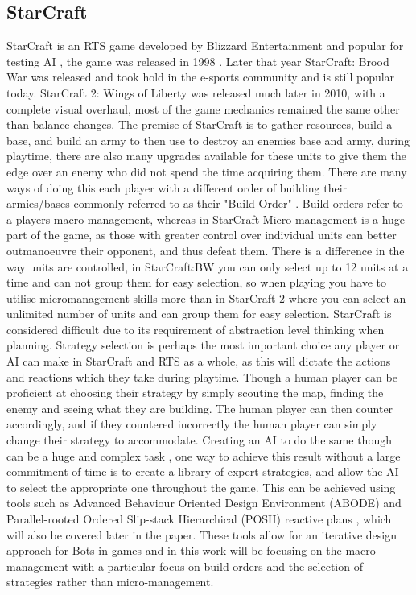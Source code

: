 \documentclass[journal]{IEEEtran}
\begin{document}
	\subsection{StarCraft}
	StarCraft is an RTS game developed by Blizzard Entertainment \cite{Blizzard} and popular for testing AI \cite{Current}, the game was released in 1998 \cite{Release}. Later that year StarCraft: Brood War was released and took hold in the e-sports community and is still popular today. StarCraft 2: Wings of Liberty was released much later in 2010, with a complete visual overhaul, most of the game mechanics remained the same other than balance changes. The premise of StarCraft is to gather resources, build a base, and build an army to then use to destroy an enemies base and army, during playtime, there are also many upgrades available for these units to give them the edge over an enemy who did not spend the time acquiring them. There are many ways of doing this each player with a different order of building their armies/bases commonly referred to as their "Build Order" \cite{BuildOrder}. Build orders refer to a players macro-management, whereas in StarCraft Micro-management is a huge part of the game, as those with greater control over individual units can better outmanoeuvre their opponent, and thus defeat them. There is a difference in the way units are controlled, in StarCraft:BW you can only select up to 12 units at a time and can not group them for easy selection, so when playing you have to utilise micromanagement skills more than in StarCraft 2 where you can select an unlimited number of units and can group them for easy selection.
	StarCraft is considered difficult due to its requirement of abstraction level thinking when planning. Strategy selection is perhaps the most important choice any player or AI can make in StarCraft and RTS as a whole, as this will dictate the actions and reactions which they take during playtime. Though a human player can be proficient at choosing their strategy by simply scouting the map, finding the enemy and seeing what they are building. The human player can then counter accordingly, and if they countered incorrectly the human player can simply change their strategy to accommodate. Creating an AI to do the same though can be a huge and complex task \cite{Fuzzy,OnlineEvo,GoalDriven}, one way to achieve this result without a large commitment of time is to create a library of expert strategies, and allow the AI to select the appropriate one throughout the game. This can be achieved using tools such as Advanced Behaviour Oriented Design Environment (ABODE) and Parallel-rooted Ordered Slip-stack Hierarchical (POSH) reactive plans \cite{POSH}, which will also be covered later in the paper. These tools allow for an iterative design approach for Bots in games and in this work will be focusing on the macro-management with a particular focus on build orders and the selection of strategies rather than micro-management. 
	
\end{document}
